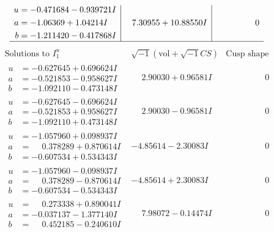 \documentclass[1p]{elsarticle_modified}
\theoremstyle{definition}
\newcommand{\I}{\sqrt{-1}}
\begin{document}
$$\begin{array}{c|c|c}
\begin{aligned}
u &= -0.471684 - 0.939721 I \\
a &= -1.06369 + 1.04214 I \\
b &= -1.211420 - 0.417868 I\end{aligned}
 & \phantom{-}7.30955 + 10.88550 I & \phantom{-0.000000 } 0\\
 \hline 
 \end{array}$$\newpage$$\begin{array}{c|c|c}  
\text{Solutions to }I^u_{1}& \I (\text{vol} + \sqrt{-1}CS) & \text{Cusp shape}\\
 \hline 
\begin{aligned}
u &= -0.627645 + 0.696624 I \\
a &= -0.521853 - 0.958627 I \\
b &= -1.092110 - 0.473148 I\end{aligned}
 & \phantom{-}2.90030 + 0.96581 I & \phantom{-0.000000 } 0 \\ \hline\begin{aligned}
u &= -0.627645 - 0.696624 I \\
a &= -0.521853 + 0.958627 I \\
b &= -1.092110 + 0.473148 I\end{aligned}
 & \phantom{-}2.90030 - 0.96581 I & \phantom{-0.000000 } 0 \\ \hline\begin{aligned}
u &= -1.057960 + 0.098937 I \\
a &= \phantom{-}0.378289 + 0.870614 I \\
b &= -0.607534 + 0.534343 I\end{aligned}
 & -4.85614 - 2.30083 I & \phantom{-0.000000 } 0 \\ \hline\begin{aligned}
u &= -1.057960 - 0.098937 I \\
a &= \phantom{-}0.378289 - 0.870614 I \\
b &= -0.607534 - 0.534343 I\end{aligned}
 & -4.85614 + 2.30083 I & \phantom{-0.000000 } 0 \\ \hline\begin{aligned}
u &= \phantom{-}0.273338 + 0.890041 I \\
a &= -0.037137 - 1.377140 I \\
b &= \phantom{-}0.452185 - 0.240610 I\end{aligned}
 & \phantom{-}7.98072 - 0.14474 I & \phantom{-0.000000 } 0 \\ \hline\begin{aligned}

\end{aligned}
\end{array}$$
\end{document}
